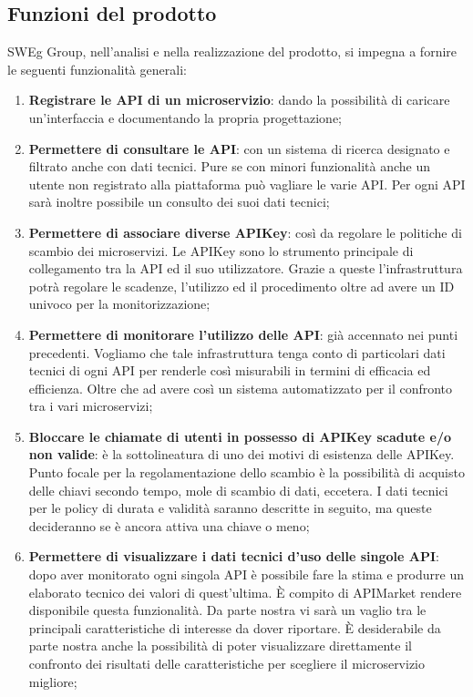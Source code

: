 \documentclass[12pt,a4paper,titlepage]{article}
\begin{document}
	\subsection{Funzioni del prodotto}
	SWEg Group, nell'analisi e nella realizzazione del prodotto, si impegna a fornire le seguenti funzionalità generali:
	\begin{enumerate}
		\item \textbf{Registrare le API di un microservizio}: dando la possibilità di caricare un'interfaccia e documentando la propria progettazione;
		\item \textbf{Permettere di consultare le API}: con un sistema di ricerca designato e filtrato anche con dati tecnici. Pure se con minori funzionalità anche un utente non registrato alla piattaforma può vagliare le varie API. Per ogni API sarà inoltre possibile un consulto dei suoi dati tecnici;
		\item \textbf{Permettere di associare diverse APIKey}: così da regolare le politiche di scambio dei microservizi. Le APIKey sono lo strumento principale di collegamento tra la API ed il suo utilizzatore. Grazie a queste l'infrastruttura potrà regolare le scadenze, l'utilizzo ed il procedimento oltre ad avere un ID univoco per la monitorizzazione;
		\item \textbf{Permettere di monitorare l'utilizzo delle API}: già accennato nei punti precedenti. Vogliamo che tale infrastruttura tenga conto di particolari dati tecnici di ogni API per renderle così misurabili in termini di efficacia ed efficienza. Oltre che ad avere così un sistema automatizzato per il confronto tra i vari microservizi;
		\item \textbf{Bloccare le chiamate di utenti in possesso di APIKey scadute e/o non valide}:	è la sottolineatura di uno dei motivi di esistenza delle APIKey. Punto focale per la regolamentazione dello scambio è la possibilità di acquisto delle chiavi secondo tempo, mole di scambio di dati, eccetera. I dati tecnici per le policy di durata e validità saranno descritte in seguito, ma queste decideranno se è ancora attiva una chiave o meno;
		\item \textbf{Permettere di visualizzare i dati tecnici d'uso delle singole API}: dopo aver monitorato ogni singola API è possibile fare la stima e produrre un elaborato tecnico dei valori di quest'ultima. È compito di APIMarket rendere disponibile questa funzionalità. Da parte nostra vi sarà un vaglio tra le principali caratteristiche di interesse da dover riportare. È desiderabile da parte nostra anche la possibilità di poter visualizzare direttamente il confronto dei risultati delle caratteristiche per scegliere il microservizio migliore;

\end{enumerate}
\end{document}
